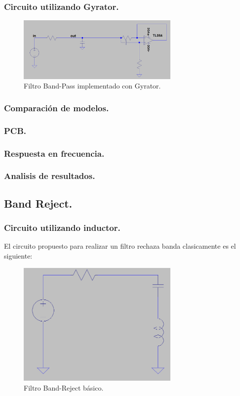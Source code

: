 \documentclass[a4paper]{article}
\begin{document}
\subsubsection{Circuito utilizando Gyrator.}
\begin{figure}[H]	
	\centering
	\includegraphics[width=0.7\textwidth]{gyrBP.PNG}
	\caption{Filtro Band-Pass implementado con Gyrator.}
	\label{fig:gyrBP}
\end{figure}
\subsubsection{Comparación de modelos.}
\subsubsection{PCB.}
\subsubsection{Respuesta en frecuencia.}
\subsubsection{Analisis de resultados.}
\newpage
\subsection{Band Reject.}
\subsubsection{Circuito utilizando inductor.}
El circuito propuesto para realizar un filtro rechaza banda clasicamente es el siguiente:
\begin{figure}[H]	
	\centering
	\includegraphics[width=0.7\textwidth]{basicBR.PNG}
	\caption{Filtro Band-Reject básico.}
	\label{fig:basBR}
\end{figure}
\end{document}
